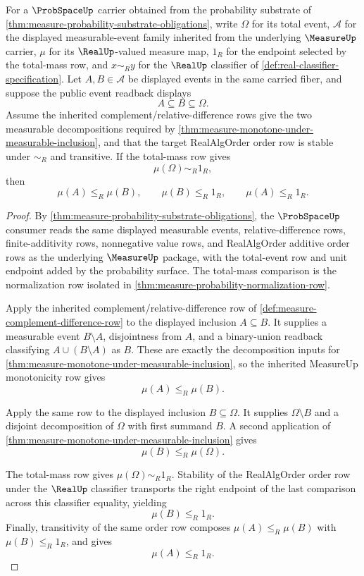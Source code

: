 \begin{theorem}
\label{thm:probspace-monotone-event-bounds}
For a $\ProbSpaceUp$ carrier obtained from the probability substrate of \autoref{thm:measure-probability-substrate-obligations}, write $\Omega$ for its total event, $\mathcal{A}$ for the displayed measurable-event family inherited from the underlying $\MeasureUp$ carrier, $\mu$ for its $\RealUp$-valued measure map, $1_R$ for the endpoint selected by the total-mass row, and $x\sim_R y$ for the $\RealUp$ classifier of \autoref{def:real-classifier-specification}. Let $A,B\in\mathcal{A}$ be displayed events in the same carried fiber, and suppose the public event readback displays
$$
A\subseteq B\subseteq\Omega.
$$
Assume the inherited complement/relative-difference rows give the two measurable decompositions required by \autoref{thm:measure-monotone-under-measurable-inclusion}, and that the target RealAlgOrder order row is stable under $\sim_R$ and transitive. If the total-mass row gives
$$
\mu(\Omega)\sim_R1_R,
$$
then
$$
\mu(A)\le_R\mu(B),\qquad \mu(B)\le_R1_R,\qquad \mu(A)\le_R1_R.
$$
\end{theorem}
\begin{proof}
By \autoref{thm:measure-probability-substrate-obligations}, the $\ProbSpaceUp$ consumer reads the same displayed measurable events, relative-difference rows, finite-additivity rows, nonnegative value rows, and RealAlgOrder additive order rows as the underlying $\MeasureUp$ package, with the total-event row and unit endpoint added by the probability surface. The total-mass comparison is the normalization row isolated in \autoref{thm:measure-probability-normalization-row}.

Apply the inherited complement/relative-difference row of \autoref{def:measure-complement-difference-row} to the displayed inclusion $A\subseteq B$. It supplies a measurable event $B\setminus A$, disjointness from $A$, and a binary-union readback classifying $A\cup(B\setminus A)$ as $B$. These are exactly the decomposition inputs for \autoref{thm:measure-monotone-under-measurable-inclusion}, so the inherited MeasureUp monotonicity row gives
$$
\mu(A)\le_R\mu(B).
$$

Apply the same row to the displayed inclusion $B\subseteq\Omega$. It supplies $\Omega\setminus B$ and a disjoint decomposition of $\Omega$ with first summand $B$. A second application of \autoref{thm:measure-monotone-under-measurable-inclusion} gives
$$
\mu(B)\le_R\mu(\Omega).
$$

The total-mass row gives $\mu(\Omega)\sim_R1_R$. Stability of the RealAlgOrder order row under the $\RealUp$ classifier transports the right endpoint of the last comparison across this classifier equality, yielding
$$
\mu(B)\le_R1_R.
$$
Finally, transitivity of the same order row composes $\mu(A)\le_R\mu(B)$ with $\mu(B)\le_R1_R$, and gives
$$
\mu(A)\le_R1_R.
$$
\end{proof}

